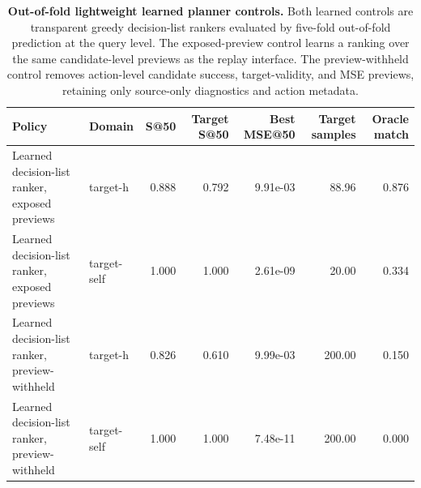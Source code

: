 \begin{table}[t]
\centering
\caption{\textbf{Out-of-fold lightweight learned planner controls.}
Both learned controls are transparent greedy decision-list rankers evaluated by five-fold out-of-fold prediction at the query level. The exposed-preview control learns a ranking over the same candidate-level previews as the replay interface. The preview-withheld control removes action-level candidate success, target-validity, and MSE previews, retaining only source-only diagnostics and action metadata.}
\begin{tabular}{llrrrrr}
\toprule
Policy & Domain & S@50 & Target S@50 & Best MSE@50 & Target samples & Oracle match \\
\midrule
Learned decision-list ranker, exposed previews & target-h & 0.888 & 0.792 & 9.91e-03 & 88.96 & 0.876 \\
Learned decision-list ranker, exposed previews & target-self & 1.000 & 1.000 & 2.61e-09 & 20.00 & 0.334 \\
Learned decision-list ranker, preview-withheld & target-h & 0.826 & 0.610 & 9.99e-03 & 200.00 & 0.150 \\
Learned decision-list ranker, preview-withheld & target-self & 1.000 & 1.000 & 7.48e-11 & 200.00 & 0.000 \\
\bottomrule
\end{tabular}
\end{table}
